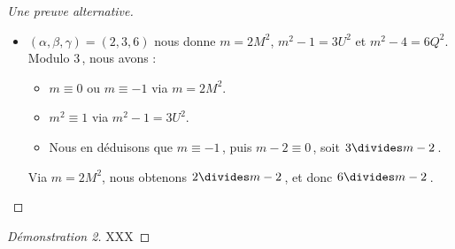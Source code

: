 \begin{proof}[Une preuve alternative]
\begin{itemize}
		\item $(\alpha, \beta, \gamma) = (2, 3, 6)$ nous donne $m = 2 M^2$, $m^2 - 1 = 3 U^2$ et $m^2 - 4 = 6 Q^2$.
		Modulo $3$\,, nous avons :
		\begin{itemize}
			\item $m \equiv 0$ ou $m \equiv -1$ via $m = 2 M^2$.

			\item $m^2 \equiv 1$ via $m^2 - 1 = 3 U^2$.

			\item Nous en déduisons que $m \equiv -1$\,, puis $m - 2 \equiv 0$\,, soit $3 \divides m - 2$\,.
		\end{itemize}

		\smallskip
		
		\noindent
		Via $m = 2 M^2$, nous obtenons $2 \divides m - 2$\,, et donc $6 \divides m - 2$\,.
	\end{itemize}
\end{proof}




\begin{proof}[Démonstration 2]

	 XXX
\end{proof}